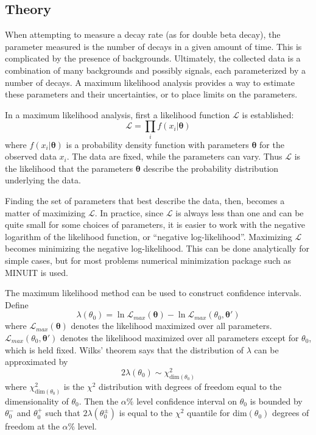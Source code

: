 \documentclass[herrin-thesis.tex]{subfiles}
\begin{document}
\subsection{Theory}
When attempting to measure a decay rate (as for double beta decay), the parameter measured is the number of decays in a given amount of time. This is complicated by the presence of backgrounds. Ultimately, the collected data is a combination of many backgrounds and possibly signals, each parameterized by a number of decays. A maximum likelihood analysis provides a way to estimate these parameters and their uncertainties, or to place limits on the parameters.

In a maximum likelihood analysis, first a likelihood function \(\mathcal{L}\) is established:
\begin{equation}
\mathcal{L} = \prod_i f(x_i|\boldsymbol{\theta})
\end{equation}
where \(f(x_i|\boldsymbol{\theta})\) is a probability density function with parameters \(\boldsymbol{\theta}\) for the observed data \(x_i\). The data are fixed, while the parameters can vary. Thus \(\mathcal{L}\) is the likelihood that the parameters \(\boldsymbol{\theta}\) describe the probability distribution underlying the data.

Finding the set of parameters that best describe the data, then, becomes a matter of maximizing \(\mathcal{L}\). In practice, since \(\mathcal{L}\) is always less than one and can be quite small for some choices of parameters, it is easier to work with the negative logarithm of the likelihood function, or ``negative log-likelihood''. Maximizing \(\mathcal{L}\) becomes minimizing the negative log-likelihood. This can be done analytically for simple cases, but for most problems numerical minimization package such as MINUIT\cite{James:1975kx} is used.

The maximum likelihood method can be used to construct confidence intervals. Define
\begin{equation}
\lambda({\theta_0}) = \ln \mathcal{L}_{max}(\boldsymbol{\theta}) - \ln \mathcal{L}_{max}(\theta_0, \boldsymbol{\theta}')
\end{equation}
where \(\mathcal{L}_{max}(\boldsymbol{\theta})\) denotes the likelihood maximized over all parameters. \(\mathcal{L}_{max}(\theta_0, \boldsymbol{\theta}')\) denotes the likelihood maximized over all parameters except for \(\theta_0\), which is held fixed. Wilks' theorem says that the distribution of \(\lambda\) can be approximated by
\begin{equation}
2\lambda(\theta_0) \sim \chi^2_{\text{dim}(\theta_0)}
\label{eq:analysis_nll_distribution}
\end{equation}
where \(\chi^2_{\text{dim}(\theta_0)}\) is the \(\chi^2\) distribution with degrees of freedom equal to the dimensionality of \(\theta_0\). Then the \(\alpha\%\) level confidence interval on \(\theta_0\) is bounded by \(\theta_0^-\) and \(\theta_0^+\) such that \(2\lambda(\theta_0^\pm)\) is equal to the \(\chi^2\) quantile for \(\text{dim}(\theta_0)\) degrees of freedom at the \(\alpha\%\) level.
\end{document}
